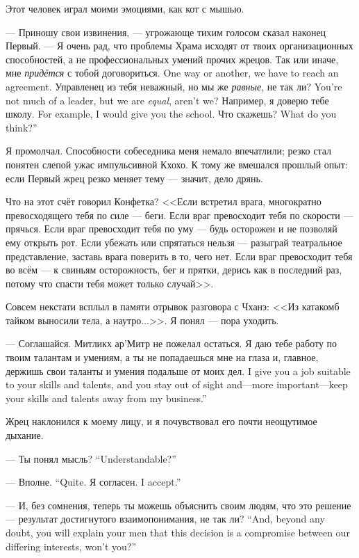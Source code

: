Этот человек играл моими эмоциями, как кот с мышью.

--- Приношу свои извинения, --- угрожающе тихим голосом сказал наконец Первый.
--- Я очень рад, что проблемы Храма исходят от твоих организационных способностей, а не профессиональных умений прочих жрецов.
{Так или иначе, мне \emph{придётся} с тобой договориться.}
{One way or another, we have to reach an agreement.}
{Управленец из тебя неважный, но мы же \emph{равные}, не так ли?}
{You're not much of a leader, but we are \emph{equal}, aren't we?}
{Например, я доверю тебе школу.}
{For example, I would give you the school.}
{Что скажешь?}
{What do you think?''}

Я промолчал.
Способности собеседника меня немало впечатлили;
резко стал понятен слепой ужас импульсивной Кхохо.
К тому же вмешался прошлый опыт: если Первый жрец резко меняет тему --- значит, дело дрянь.

Что на этот счёт говорил Конфетка?
<<Если встретил врага, многократно превосходящего тебя по силе --- беги.
Если враг превосходит тебя по скорости --- прячься.
Если враг превосходит тебя по уму --- будь осторожен и не позволяй ему открыть рот.
Если убежать или спрятаться нельзя --- разыграй театральное представление, заставь врага поверить в то, чего нет.
Если враг превосходит тебя во всём --- к свиньям осторожность, бег и прятки, дерись как в последний раз, потому что спасти тебя может только случай>>.

Совсем некстати всплыл в памяти отрывок разговора с Чханэ: <<Из катакомб тайком выносили тела, а наутро...>>.
Я понял --- пора уходить.

--- Соглашайся.
Митликх ар'Митр не пожелал остаться.
{Я даю тебе работу по твоим талантам и умениям, а ты не попадаешься мне на глаза и, главное, держишь свои таланты и умения подальше от моих дел.}
{I give you a job suitable to your skills and talents, and you stay out of sight and---more important---keep your skills and talents away from my business.''}

Жрец наклонился к моему лицу, и я почувствовал его почти неощутимое дыхание.

{--- Ты понял мысль?}
{``Understandable?''}

{--- Вполне.}
{``Quite.}
{Я согласен.}
{I accept.''}

{--- И, без сомнения, теперь ты можешь объяснить своим людям, что это решение --- результат достигнутого взаимопонимания, не так ли?}
{``And, beyond any doubt, you will explain your men that this decision is a compromise between our differing interests, won't you?''}


